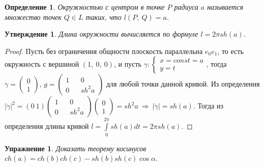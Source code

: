 \documentclass[12pt]{article}
\theoremstyle{plain}
\newtheorem{subtheorem}{Утверждение}[section]
\newtheorem*{exercise}{Упражнение}
\newtheorem{definition}{Определение}[section]
\begin{document}
    \begin{definition}
        Окружностью с центром в точке $P$ радиуса $a$ называется множество точек $Q\in L$ таких, что $l(P, \ Q)=a$.
    \end{definition}
    \begin{subtheorem}
        Длина окружности вычисляется по формуле $l=2\pi sh(a)$.
    \end{subtheorem}
    \begin{proof}
        Пусть без ограничения общности плоскость параллельна $e_0e_1$, то есть окружность с вершиной $(1, \ 0, \ 0)$, и пусть $\gamma:\begin{cases}
            x=const=a\\
            y=t
        \end{cases}$, тогда $\dot{\gamma}=\begin{pmatrix}
            0\\
            1
        \end{pmatrix}$, $g=\begin{pmatrix}
            1 && 0\\
            0 && sh^2a
        \end{pmatrix}$ для любой точки данной кривой. Из определения $|\dot{\gamma}|^2=(0 \ 1)\begin{pmatrix}
            1 && 0\\
            0 && sh^2a
        \end{pmatrix}\begin{pmatrix}
            0\\
            1
        \end{pmatrix}=sh^2a \ \Longrightarrow \ |\dot{\gamma}|=sh(a)$. Тогда из определения длины кривой $l=\int\limits_0^{2\pi}sh(a)dt=2\pi sh(a)$.
    \end{proof}
    \begin{exercise}
        Доказать теорему косинусов $ch(a)=ch(b)ch(c)-sh(b)sh(c)\cos\alpha$.
    \end{exercise}
\end{document}
